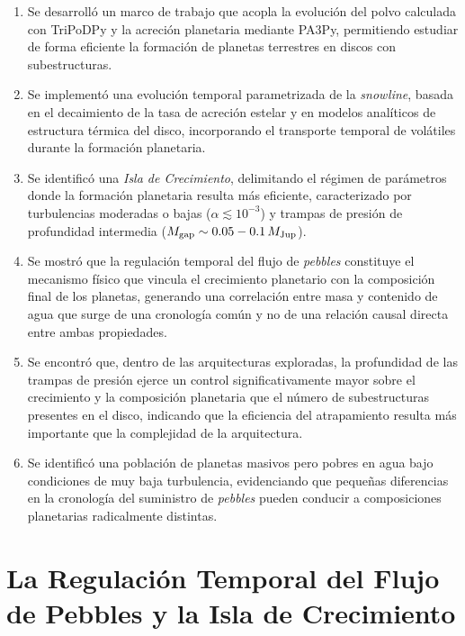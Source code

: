 \begin{enumerate}
    \item Se desarrolló un marco de trabajo que acopla la evolución del polvo calculada con TriPoDPy y la acreción planetaria mediante PA3Py, permitiendo estudiar de forma eficiente la formación de planetas terrestres en discos con subestructuras.

    \item Se implementó una evolución temporal parametrizada de la \textit{snowline}, basada en el decaimiento de la tasa de acreción estelar y en modelos analíticos de estructura térmica del disco, incorporando el transporte temporal de volátiles durante la formación planetaria.

    \item Se identificó una \textit{Isla de Crecimiento}, delimitando el régimen de parámetros donde la formación planetaria resulta más eficiente, caracterizado por turbulencias moderadas o bajas ($\alpha \lesssim 10^{-3}$) y trampas de presión de profundidad intermedia ($M_{\rm gap}\sim0.05-0.1\,M_{\rm Jup}$).

    \item Se mostró que la regulación temporal del flujo de \textit{pebbles} constituye el mecanismo físico que vincula el crecimiento planetario con la composición final de los planetas, generando una correlación entre masa y contenido de agua que surge de una cronología común y no de una relación causal directa entre ambas propiedades.

    \item Se encontró que, dentro de las arquitecturas exploradas, la profundidad de las trampas de presión ejerce un control significativamente mayor sobre el crecimiento y la composición planetaria que el número de subestructuras presentes en el disco, indicando que la eficiencia del atrapamiento resulta más importante que la complejidad de la arquitectura.

    \item Se identificó una población de planetas masivos pero pobres en agua bajo condiciones de muy baja turbulencia, evidenciando que pequeñas diferencias en la cronología del suministro de \textit{pebbles} pueden conducir a composiciones planetarias radicalmente distintas.
\end{enumerate}

\section{La Regulación Temporal del Flujo de Pebbles y la Isla de Crecimiento}

